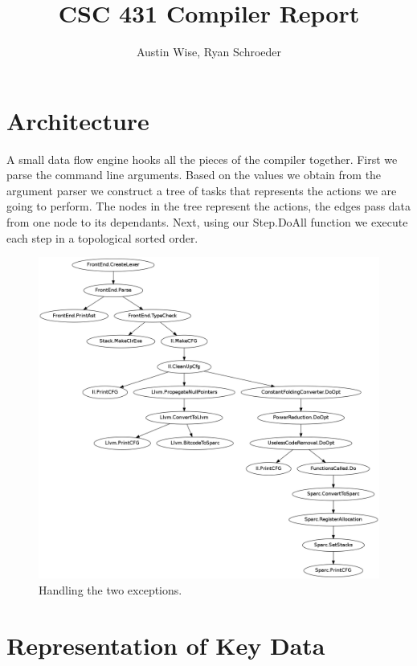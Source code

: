 \documentclass[12pt]{article}
\title{CSC 431 Compiler Report}
\date{}
\author{Austin Wise, Ryan Schroeder}
\begin{document}
\maketitle
\tableofcontents

\pagebreak

\section{Architecture}

A small data flow engine hooks all the pieces of the compiler together.
First we parse the command line arguments.
Based on the values we obtain from the argument parser we construct a tree of tasks that represents the actions we are going to perform.
The nodes in the tree represent the actions, the edges pass data from one node to its dependants.
Next, using our Step.DoAll function we execute each step in a topological sorted order.

\begin{figure}
\includegraphics{compSteps.png}
\caption{Handling the two exceptions.}
\label{success}
\end{figure}

	
\pagebreak

\section{Representation of Key Data}
\end{document}
